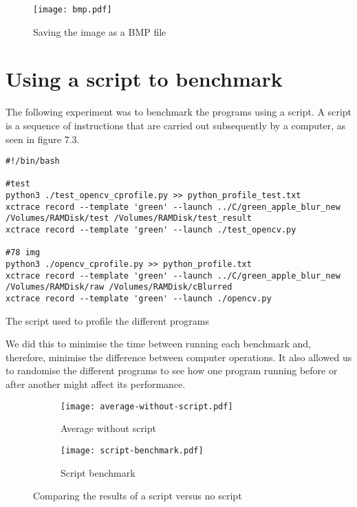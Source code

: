\begin{figure}[H]
	\centering
	\texttt{[image: bmp.pdf]}
	\caption{Saving the image as a BMP file}
	\label{figure:bmp}
\end{figure}

\section{Using a script to benchmark}
The following experiment was to benchmark the programs using a script. A script is a sequence of instructions that are carried out subsequently by a computer, as seen in figure 7.3.

\begin{listing}[!ht]
	\begin{verbatim}
#!/bin/bash

#test
python3 ./test_opencv_cprofile.py >> python_profile_test.txt
xctrace record --template 'green' --launch ../C/green_apple_blur_new
/Volumes/RAMDisk/test /Volumes/RAMDisk/test_result
xctrace record --template 'green' --launch ./test_opencv.py

#78 img
python3 ./opencv_cprofile.py >> python_profile.txt
xctrace record --template 'green' --launch ../C/green_apple_blur_new
/Volumes/RAMDisk/raw /Volumes/RAMDisk/cBlurred
xctrace record --template 'green' --launch ./opencv.py
	\end{verbatim}
	\caption{The script used to profile the different programs}
	\label{listing:script}
	\end{listing}

We did this to minimise the time between running each benchmark and, therefore, minimise the difference between computer operations. It also allowed us to randomise the different programs to see how one program running before or after another might affect its performance.

\begin{figure}[H]
	\centering
	\begin{subfigure}{.5\textwidth}
	  \centering
	  \texttt{[image: average-without-script.pdf]}
	  \caption{Average without script}
	  \label{fig:no-script}
	\end{subfigure}%
	\begin{subfigure}{.5\textwidth}
	  \centering
	  \texttt{[image: script-benchmark.pdf]}
	  \caption{Script benchmark}
	  \label{fig:script}
	\end{subfigure}
	\caption{Comparing the results of a script versus no script}
	\label{fig:script-vs-noscript}
\end{figure}

